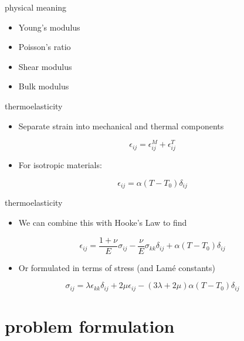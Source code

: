 \documentclass[
  letterpaper,
  ignorenonframetext,
  aspectratio=43,
  handout,
  12pt]{beamer}
\providecommand{\tightlist}{%
  \setlength{\itemsep}{0pt}\setlength{\parskip}{0pt}}
\providecommand{\tightlist}{%
\setlength{\itemsep}{0pt}\setlength{\parskip}{0pt}}
\begin{document}
\begin{frame}{physical meaning}
\protect\hypertarget{physical-meaning}{}
\begin{itemize}
\tightlist
\item
  Young's modulus
\item
  Poisson's ratio
\item
  Shear modulus
\item
  Bulk modulus
\end{itemize}
\end{frame}

\begin{frame}{thermoelasticity}
\protect\hypertarget{thermoelasticity}{}
\begin{itemize}
\tightlist
\item
  Separate strain into mechanical and thermal components
\end{itemize}

\[\epsilon_{ij} = \epsilon_{ij}^M + \epsilon_{ij}^T\]

\begin{itemize}
\tightlist
\item
  For isotropic materials:
\end{itemize}

\[\epsilon_{ij} = \alpha (T - T_0)\delta_{ij}\]
\end{frame}

\begin{frame}{thermoelasticity}
\protect\hypertarget{thermoelasticity-1}{}
\begin{itemize}
\tightlist
\item
  We can combine this with Hooke's Law to find
\end{itemize}

\[\epsilon_{ij} = \frac{1+\nu}{E}\sigma_{ij} -\frac{\nu}{E}\sigma_{kk}\delta_{ij} + \alpha (T-T_0)\delta_{ij}\]

\begin{itemize}
\tightlist
\item
  Or formulated in terms of stress (and Lamé constants)
\end{itemize}

\[\sigma_{ij} = \lambda \epsilon_{kk} \delta_{ij} + 2\mu \epsilon_{ij} - (3\lambda + 2\mu) \alpha (T - T_0) \delta_{ij}\]
\end{frame}

\hypertarget{problem-formulation}{%
\section{problem formulation}\label{problem-formulation}}
\end{document}
